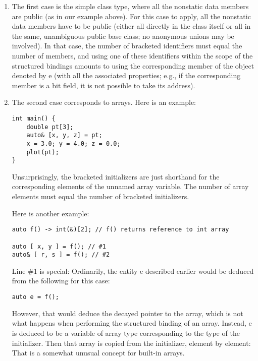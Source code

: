 \begin{enumerate}
\item
The first case is the simple class type, where all the nonstatic data members are public (as in our example above). For this case to apply, all the nonstatic data members have to be public (either all directly in the class itself or all in the same, unambiguous public base class; no anonymous unions may be involved). In that case, the number of bracketed identifiers must equal the number of members, and using one of these identifiers within the scope of the structured bindings amounts to using the corresponding member of the object denoted by e (with all the associated properties; e.g., if the corresponding member is a bit field, it is not possible to take its address).

\item
The second case corresponds to arrays. Here is an example:

\begin{lstlisting}[style=styleCXX]
int main() {
	double pt[3];
	auto& [x, y, z] = pt;
	x = 3.0; y = 4.0; z = 0.0;
	plot(pt);
}
\end{lstlisting}

Unsurprisingly, the bracketed initializers are just shorthand for the corresponding elements of the unnamed array variable. The number of array elements must equal the number of bracketed initializers.

Here is another example:

\begin{lstlisting}[style=styleCXX]
auto f() -> int(&)[2]; // f() returns reference to int array

auto [ x, y ] = f(); // #1
auto& [ r, s ] = f(); // #2
\end{lstlisting}

Line \#1 is special: Ordinarily, the entity e described earlier would be deduced from the following for this case:

\begin{lstlisting}[style=styleCXX]
auto e = f();
\end{lstlisting}

However, that would deduce the decayed pointer to the array, which is not what happens when performing the structured binding of an array. Instead, e is deduced to be a variable of array type corresponding to the type of the initializer. Then that array is copied from the initializer, element by element: That is a somewhat unusual concept for built-in arrays.


\end{enumerate}
